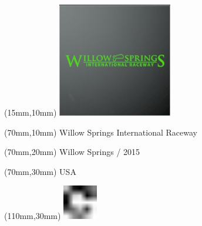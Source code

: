 \null\newpage
\begin{textblock*}{50mm}(15mm,10mm)%
\includegraphics[width=50mm]{LG/2015-05-20_00098.png}
\end{textblock*}
\begin{textblock*}{130mm}(70mm,10mm)%
{\fontsize{20}{20}\selectfont Willow Springs International Raceway}\\
\end{textblock*}
\begin{textblock*}{120mm}(70mm,20mm)%
{\fontsize{16}{16}\selectfont Willow Springs / 2015}\\
\end{textblock*}
\begin{textblock*}{120mm}(70mm,30mm)%
{\fontsize{12}{12}\selectfont USA}
\end{textblock*}
\begin{textblock*}{30mm}(110mm,30mm)%
\centering
\includegraphics[height=15mm]{icons/fa-rotate-right.pdf}
\end{textblock*}
